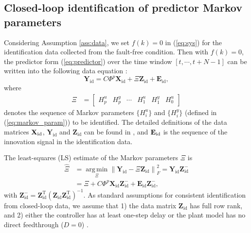 \documentclass[twocolumn]{autart}
\DeclareMathOperator*{\argmin}{\arg\,\min}
\begin{document}
\subsection{Closed-loop identification of predictor Markov parameters}\label{sect:IDmarkov}
Considering Assumption \ref{ass:data}, we set $f(k) = 0$ in (\ref{eq:sys}) for the identification data collected from the fault-free condition.
Then with $f(k) = 0$, the predictor form (\ref{eq:predictor}) over the time window $\left[ t, \cdots, t+N-1 \right]$ can be written into the following data equation \cite{Chiuso2007a, Veen2012}:
\begin{equation}\label{eq:data_eq}
\mathbf{Y}_{\mathrm{id}} = C \Phi^p \mathbf{X}_{\mathrm{id}} + \Xi \mathbf{Z}_{\mathrm{id}} + \mathbf{E}_{\mathrm{id}},
\end{equation}
where
\begin{align}
\Xi &= \left[ \begin{array}{cccccc}
				H_{p}^u & H_{p}^y & \cdots & H_{1}^u & H_{1}^y & H_{0}^u
				\end{array}
			\right]   \label{eq:Xi}
\end{align}
denotes the sequence of Markov parameters $\{H_i^u\}$ and $\{H_i^y\}$ (defined in (\ref{eq:markov_param})) to be identified. 
The detailed definitions of the data matrices $\mathbf{X}_{\rm{id}}$, $\mathbf{Y}_{\mathrm{id}}$ and $\mathbf{Z}_{\mathrm{id}}$ can be found in \cite{Veen2012}, and $\mathbf{E}_{\rm{id}}$ is the sequence of the innovation signal in the identification data. 


The least-squares (LS) estimate of the Markov parameters $\Xi$ is
\begin{equation}\label{eq:LS_id}
\begin{aligned}
\hat \Xi &= \argmin\limits_{\Xi}
\left\| \mathbf{Y}_{\mathrm{id}} - \Xi \mathbf{Z}_{\mathrm{id}}  \right\|_F^2
= \mathbf{Y}_{\mathrm{id}} \mathbf{Z}_{\mathrm{id}}^{-} \\
&= \Xi + C \Phi^p \mathbf{X}_{\mathrm{id}} \mathbf{Z}_{\mathrm{id}}^{-}
+ \mathbf{E}_{\mathrm{id}} \mathbf{Z}_{\mathrm{id}}^{-},
\end{aligned}
\end{equation}
with $\mathbf{Z}_{\mathrm{id}}^{-} =
\mathbf{Z}_{\mathrm{id}}^{\mathrm{T}}
\left( \mathbf{Z}_{\mathrm{id}} \mathbf{Z}_{\mathrm{id}}^{\mathrm{T}} \right)^{-1}$.
As standard assumptions for consistent identification from closed-loop data, we assume that 1) the data matrix $\mathbf{Z}_{\mathrm{id}}$ has full row rank, and 2) either the controller has at least one-step delay or the plant model has no direct feedthrough ($D=0$) \cite{Chiuso2007a, Veen2012}.
\end{document}
